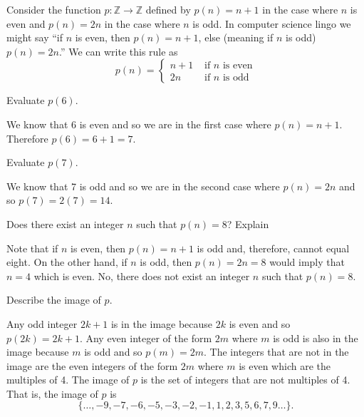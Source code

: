 \begin{exam}
\label{exam_piecewise_defined_function}
    Consider the function $p: \mathbb{Z} \to \mathbb{Z}$ defined by $p(n)=n+1$ in the case where $n$ is even and $p(n) = 2n$ in the case where $n$ is odd.  
    In computer science lingo we might say ``if $n$ is even, then $p(n)=n+1$, else (meaning if $n$ is odd) $p(n)= 2n$.''
    We can write this rule as
        $$p(n) = \left\{ 
        \begin{array}{cc} 
            n+1 & \text{ if $n$ is even} \\
            2n & \text{ if $n$ is odd} 
        \end{array}
        \right.$$ 
    \begin{apart}
        \item Evaluate $p(6)$.
            \begin{soln}
                We know that 6 is even and so we are in the first case where $p(n) = n+1$.  Therefore $p(6)=6+1=7$.
            \end{soln}
        \item Evaluate $p(7)$.
            \begin{soln}
               We know that 7 is odd and so we are in the second case where $p(n) = 2n$ and so $p(7) = 2(7) = 14$.
            \end{soln}
        \item \label{part_8notinimage} Does there exist an integer $n$ such that $p(n) = 8$?  Explain
            \begin{soln}
                Note that if $n$ is even, then $p(n) = n+1$ is odd and, therefore, cannot equal eight.  On the other hand, if $n$ is odd, then $p(n) = 2n =8$ would imply that $n=4$ which is even.  No, there does not exist an integer $n$ such that $p(n)=8$.
            \end{soln}
        \item Describe the image of $p$.
            \begin{soln}
                Any odd integer $2k+1$ is in the image because $2k$ is even and so $p(2k) = 2k+1$. Any even integer of the form $2m$ where $m$ is odd is also in the image because $m$ is odd and so $p(m) = 2m$.  The integers that are not in the image are the even integers of the form $2m$ where $m$ is even which are the multiples of 4.  The image of $p$ is the set of integers that are not multiples of 4. That is, the image of $p$ is
                    $$\{ \ldots,-9, -7, -6, -5, -3, -2, -1, 1, 2, 3, 5, 6, 7, 9 \ldots\}.$$
            \end{soln}
    \end{apart}
\end{exam}

